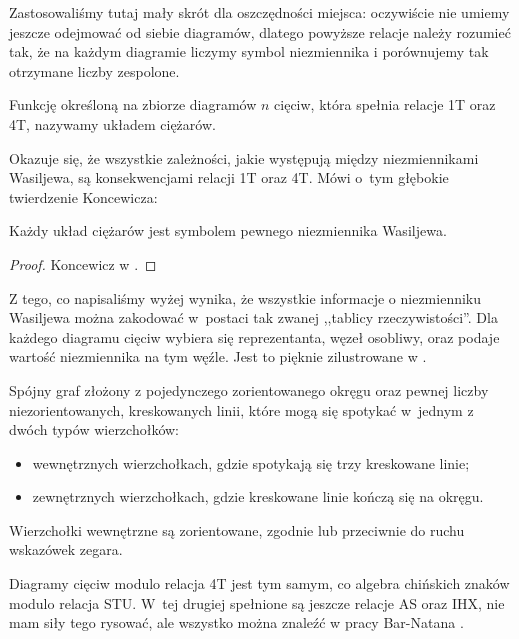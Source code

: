 Zastosowaliśmy tutaj mały skrót dla oszczędności miejsca: oczywiście nie umiemy jeszcze odejmować od siebie diagramów, dlatego powyższe relacje należy rozumieć tak, że na każdym diagramie liczymy symbol niezmiennika i porównujemy tak otrzymane liczby zespolone.

\begin{definition}
%
    Funkcję określoną na zbiorze diagramów $n$ cięciw, która spełnia relacje 1T oraz 4T, nazywamy układem ciężarów.
\end{definition}

Okazuje się, że wszystkie zależności, jakie występują między niezmiennikami Wasiljewa, są konsekwencjami relacji 1T oraz 4T.
Mówi o~tym głębokie twierdzenie Koncewicza:

\begin{proposition}
    Każdy układ ciężarów jest symbolem pewnego niezmiennika Wasiljewa. %
\end{proposition}

\begin{proof}
    Koncewicz w \cite{kontsevich93}. %
\end{proof}

Z tego, co napisaliśmy wyżej wynika, że wszystkie informacje o niezmienniku Wasiljewa można zakodować w~postaci tak zwanej ,,tablicy rzeczywistości''.
Dla każdego diagramu cięciw wybiera się reprezentanta, węzeł osobliwy, oraz podaje wartość niezmiennika na tym węźle.
Jest to pięknie zilustrowane w \cite[sekcja 3.7]{duzhin12}.

\begin{definition}
    Spójny graf złożony z pojedynczego zorientowanego okręgu oraz pewnej liczby niezorientowanych, kreskowanych linii, które mogą się spotykać w~jednym z dwóch typów wierzchołków:
    \begin{itemize}
        \item wewnętrznych wierzchołkach, gdzie spotykają się trzy kreskowane linie;
        \item zewnętrznych wierzchołkach, gdzie kreskowane linie kończą się na okręgu.
    \end{itemize}
    Wierzchołki wewnętrzne są zorientowane, zgodnie lub przeciwnie do ruchu wskazówek zegara.
\end{definition}

Diagramy cięciw modulo relacja 4T jest tym samym, co algebra chińskich znaków modulo relacja STU.
%
%
W~tej drugiej spełnione są jeszcze relacje AS oraz IHX, nie mam siły tego rysować, ale wszystko można znaleźć w pracy Bar-Natana \cite{barnatan_95}.
%

